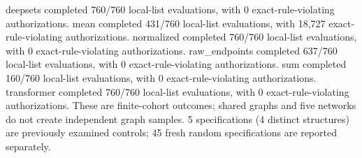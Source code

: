deepsets completed 760/760 local-list evaluations, with 0 exact-rule-violating authorizations. mean completed 431/760 local-list evaluations, with 18,727 exact-rule-violating authorizations. normalized completed 760/760 local-list evaluations, with 0 exact-rule-violating authorizations. raw\_endpoints completed 637/760 local-list evaluations, with 0 exact-rule-violating authorizations. sum completed 160/760 local-list evaluations, with 0 exact-rule-violating authorizations. transformer completed 760/760 local-list evaluations, with 0 exact-rule-violating authorizations. These are finite-cohort outcomes; shared graphs and five networks do not create independent graph samples. 5 specifications (4 distinct structures) are previously examined controls; 45 fresh random specifications are reported separately.
